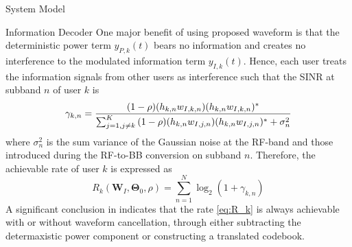 \documentclass{IEEEtran}
\begin{document}
\begin{section}{System Model}
	\begin{subsection}{Information Decoder}
		One major benefit of using proposed waveform is that the deterministic power term $y_{P,k}(t)$ bears no information and creates no interference to the modulated information term $y_{I,k}(t)$. Hence, each user treats the information signals from other users as interference such that the SINR at subband $n$ of user $k$ is
		\begin{equation}\label{eq:gamma_{k,n}}
			\gamma_{k,n}=\frac{(1-\rho)(h_{k,n}w_{I,k,n})(h_{k,n}w_{I,k,n})^*}{\sum_{j=1,j{\ne}k}^K{(1-\rho)(h_{k,n}w_{I,j,n})(h_{k,n}w_{I,j,n})^*+\sigma_n^2}}
		\end{equation}
		where $\sigma_n^2$ is the sum variance of the Gaussian noise at the RF-band and those introduced during the RF-to-BB conversion on subband $n$. Therefore, the achievable rate of user $k$ is expressed as
		\begin{equation}\label{eq:R_k}
			R_k(\boldsymbol{W}_I,\boldsymbol{\Theta}_0,\rho)=\sum_{n=1}^N{\log_2(1+\gamma_{k,n})}
		\end{equation}
		A significant conclusion in \cite{Clerckx2018b} indicates that the rate \ref{eq:R_k} is always achievable with or without waveform cancellation, through either subtracting the determaxistic power component or constructing a translated codebook.
	\end{subsection}


\end{section}
\end{document}
